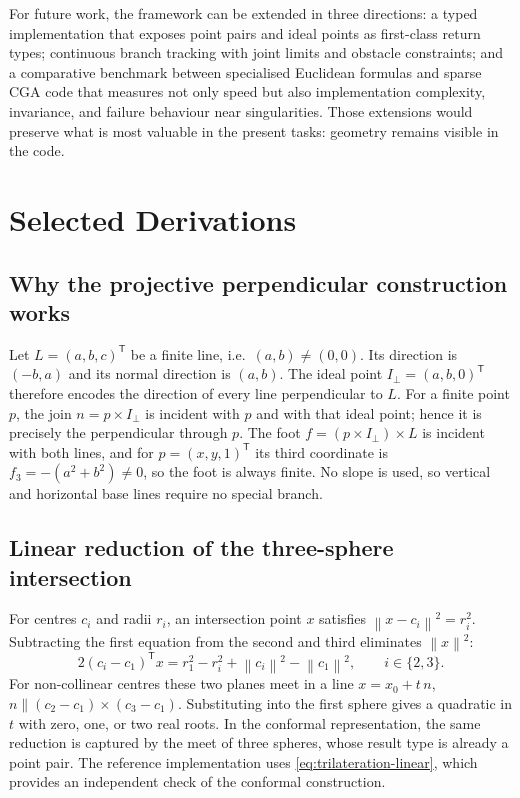 \documentclass[11pt,a4paper]{article}
\theoremstyle{plain}
\theoremstyle{definition}
\theoremstyle{remark}
\newcommand{\T}{\mathsf{T}}
\newcommand{\norm}[1]{\left\lVert#1\right\rVert}
\begin{document}
For future work, the framework can be extended in three directions: a typed
implementation that exposes point pairs and ideal points as first-class return
types; continuous branch tracking with joint limits and obstacle constraints;
and a comparative benchmark between specialised Euclidean formulas and sparse
CGA code that measures not only speed but also implementation complexity,
invariance, and failure behaviour near singularities. Those extensions would
preserve what is most valuable in the present tasks: geometry remains visible
in the code.

\appendix
\section{Selected Derivations}\label{app:derivations}

\subsection{Why the projective perpendicular construction works}\label{app:perpendicular}

Let $L=(a,b,c)^{\T}$ be a finite line, i.e.\ $(a,b)\neq(0,0)$. Its direction is
$(-b,a)$ and its normal direction is $(a,b)$. The ideal point
$I_{\perp}=(a,b,0)^{\T}$ therefore encodes the direction of every line
perpendicular to $L$. For a finite point $p$, the join $n=p\times I_{\perp}$ is
incident with $p$ and with that ideal point; hence it is precisely the
perpendicular through $p$. The foot $f=(p\times I_{\perp})\times L$ is incident
with both lines, and for $p=(x,y,1)^{\T}$ its third coordinate is
$f_3=-(a^2+b^2)\neq0$, so the foot is always finite. No slope is used, so vertical and horizontal base lines require
no special branch.

\subsection{Linear reduction of the three-sphere intersection}\label{app:trilateration}

For centres $c_i$ and radii $r_i$, an intersection point $x$ satisfies
$\norm{x-c_i}^2=r_i^2$. Subtracting the first equation from the second and third
eliminates $\norm{x}^2$:
\begin{equation}
  2(c_i-c_1)^{\T}x
  =r_1^2-r_i^2+\norm{c_i}^2-\norm{c_1}^2,
  \qquad i\in\{2,3\}.
  \label{eq:trilateration-linear}
\end{equation}
For non-collinear centres these two planes meet in a line
$x=x_0+t\,n$, $n\parallel(c_2-c_1)\times(c_3-c_1)$. Substituting into the
first sphere gives a quadratic in $t$ with zero, one, or two real roots. In the
conformal representation, the same reduction is captured by the meet of three
spheres, whose result type is already a point pair. The reference implementation
uses \cref{eq:trilateration-linear}, which provides an independent check of the
conformal construction.
\end{document}
